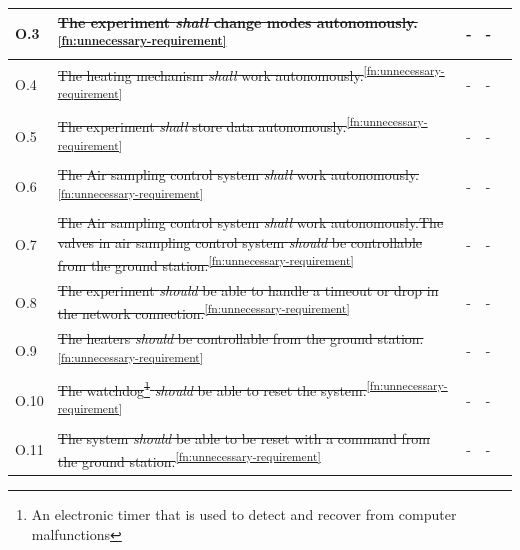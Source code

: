 \documentclass[a4paper,12pt,twoside]{article}
\begin{document}
\begin{longtable}[]{|m{}| m{} |m{} |m{}|m{}|}
O.3  & \st{The experiment \textit{shall} change modes autonomously.}\textsuperscript{\ref{fn:unnecessary-requirement}}                                                                                                              &        -      & -          &        \\ \hline
O.4  & \st{The heating mechanism \textit{shall} work autonomously.}\textsuperscript{\ref{fn:unnecessary-requirement}}                                                                                                               &        -      & -            &        \\ \hline
O.5  & \st{The experiment \textit{shall} store data autonomously.}\textsuperscript{\ref{fn:unnecessary-requirement}}                                                                                                                &       - & -            &        \\ \hline
O.6  & \st{The Air sampling control system \textit{shall} work autonomously.}\textsuperscript{\ref{fn:unnecessary-requirement}}                                                                                                     &       -     &  -          &        \\ \hline
O.7  & \st{The Air sampling control system \textit{shall} work autonomously.The valves in air sampling control system \textit{should} be controllable from the ground station.}\textsuperscript{\ref{fn:unnecessary-requirement}} &      -       &   -         &        \\ \hline
O.8  & \st{The experiment \textit{should} be able to handle a timeout or drop in the network connection.}\textsuperscript{\ref{fn:unnecessary-requirement}}                                                                         &    -         &  -  &        \\ \hline
O.9  & \st{The heaters \textit{should} be controllable from the ground station.}\textsuperscript{\ref{fn:unnecessary-requirement}}                                                                                                  &     -      &  -           &        \\ \hline
O.10 & \st{The watchdog\footnote{An electronic timer that is used to detect and recover from computer malfunctions} \textit{should} be able to reset the system.}\textsuperscript{\ref{fn:unnecessary-requirement}}               &    -        & -          &        \\ \hline
O.11 & \st{The system \textit{should} be able to be reset with a command from the ground station.}\textsuperscript{\ref{fn:unnecessary-requirement}}                                                                                &     -      & -            &        \\ \hline

\end{longtable}
\end{document}
